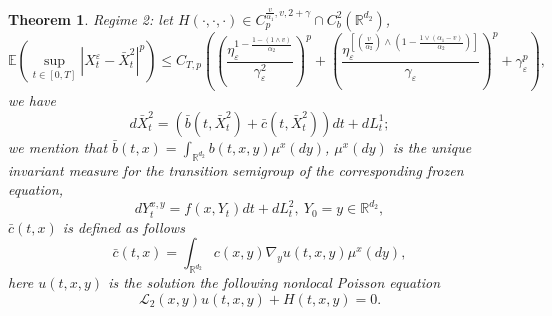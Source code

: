 \documentclass[11pt,reqno]{amsart}
\newtheorem{theorem}{\indent Theorem}[section]
\numberwithin{equation}{section}
\begin{document}
\begin{theorem}
	
	Regime 2: let $H(\cdot,\cdot,\cdot)\in C_{p}^{\frac{v}{\alpha_{1}},v, 2+\gamma}\cap C_{b}^{2}(\mathbb{R}^{d_{2}})$,
	\begin{equation}\nonumber
		\mathbb{E}\left( \sup_{t\in [0,T]}|X_{t}^{\varepsilon}-\bar{X}^{2}_{t}|^{p}\right) \leq  C_{T,p}\left(                                                                                                                                                                                                                                                                           \left(  \frac{\eta_{\varepsilon}^{1-\frac{1-(1\wedge v)}{\alpha_{2}}}}{\gamma_{\varepsilon}^{2}}\right) ^{p}+ \left(  \frac{\eta_{\varepsilon}^{\left[ \left( \frac{v}{\alpha_{2}}\right) \wedge \left( 1-\frac{1\vee(\alpha_{1}-v)}{\alpha_{2}}\right) \right] }}{\gamma_{\varepsilon} } \right) ^{p}+\gamma_{\varepsilon}^{p}\right) ,
	\end{equation}
	we have 
	\begin{equation}\nonumber
		d\bar{X}^{2}_{t}=(\bar{b}(t,\bar{X}^{2}_{t})+\bar{c}(t,\bar{X}^{2}_{t}))dt+dL_{t}^{1};
	\end{equation}
	we mention that  $\bar{b}(t,x)=\int_{\mathbb{R}^{d_{2}}}b(t,x,y)\mu^{x}(dy)$, $\mu^{x}(dy)$ is the unique invariant measure for the transition semigroup of the corresponding frozen equation, 
	\begin{equation}\label{2.23}
		dY^{x,y}_{t}=f(x,Y_{t})dt+dL^{2}_{t},\ Y_{0}=y\in \mathbb{R}^{d_{2}},
	\end{equation}
	$\bar{c}(t,x)$ is defined as follows
	\begin{equation}\label{2.24}
		\bar{c}(t,x)=\int_{\mathbb{R}^{ d_{2}}}c(x,y)\nabla_{y}u(t,x,y)\mu^{x}(dy),\nonumber
	\end{equation}
	here $u(t,x,y)$ is the solution the  following nonlocal Poisson equation
	\begin{equation}\label{2.26}
		\mathcal{L}_{2}(x,y)u(t,x,y)+ H(t,x,y)=0.
	\end{equation}
\end{theorem}
\end{document}
